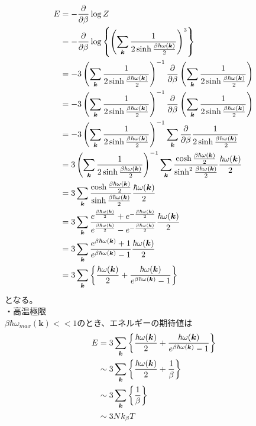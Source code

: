 \documentclass{jsarticle}  %
\numberwithin{equation}{section} %
\numberwithin{figure}{section}
\begin{document}
    \begin{align}
        E &= -\frac{\partial }{\partial \beta} \log Z \notag \\
        &= -\frac{\partial }{\partial \beta} \log \left\{ \left( \sum_{\bm{k}} \frac{1}{2 \sinh \frac{\beta \hbar \omega (\bm{k})}{2}}\right)^{3}  \right\} \notag \\
        &= -3 \left( \sum_{\bm{k}} \frac{1}{2 \sinh \frac{\beta \hbar \omega (\bm{k})}{2}}\right)^{-1} \frac{\partial }{\partial \beta}  \left( \sum_{\bm{k}} \frac{1}{2 \sinh \frac{\beta \hbar \omega (\bm{k})}{2}}\right)  \notag \\
        &= -3 \left( \sum_{\bm{k}} \frac{1}{2 \sinh \frac{\beta \hbar \omega (\bm{k})}{2}}\right)^{-1} \frac{\partial }{\partial \beta}  \left( \sum_{\bm{k}} \frac{1}{2 \sinh \frac{\beta \hbar \omega (\bm{k})}{2}}\right)  \notag \\
        &= -3 \left( \sum_{\bm{k}} \frac{1}{2 \sinh \frac{\beta \hbar \omega (\bm{k})}{2}}\right)^{-1} \sum_{\bm{k}} \frac{\partial }{\partial \beta} \frac{1}{2 \sinh \frac{\beta \hbar \omega (\bm{k})}{2}}  \notag \\
        &= 3 \left( \sum_{\bm{k}} \frac{1}{2 \sinh \frac{\beta \hbar \omega (\bm{k})}{2}}\right)^{-1} \sum_{\bm{k}} \frac{\cosh \frac{\beta \hbar \omega (\bm{k})}{2}}{ \sinh^2 \frac{\beta \hbar \omega (\bm{k})}{2}} \frac{\hbar \omega (\bm{k})}{2}  \notag \\
        &= 3 \sum_{\bm{k}} \frac{\cosh \frac{\beta \hbar \omega (\bm{k})}{2}}{ \sinh \frac{\beta \hbar \omega (\bm{k})}{2}} \frac{\hbar \omega (\bm{k})}{2}  \notag \\
        &= 3 \sum_{\bm{k}} \frac{e^{\frac{\beta \hbar \omega (\bm{k})}{2}} + e^{-\frac{\beta \hbar \omega (\bm{k})}{2}}}{ e^{\frac{\beta \hbar \omega (\bm{k})}{2}} - e^{-\frac{\beta \hbar \omega (\bm{k})}{2}}} \frac{\hbar \omega (\bm{k})}{2}  \notag \\
        &= 3 \sum_{\bm{k}} \frac{e^{\beta \hbar \omega (\bm{k})} + 1}{ e^{\beta \hbar \omega (\bm{k})} - 1} \frac{\hbar \omega (\bm{k})}{2}  \notag \\
        &=3 \sum_{\bm{k}} \left\{ \frac{\hbar \omega (\bm{k})}{2}  +\frac{\hbar \omega (\bm{k})}{ e^{\beta \hbar \omega (\bm{k})} - 1} \right\}
    \end{align}
    となる。\\
    ・高温極限\\
    $\beta \hbar \omega_{max}(\bm{k}) << 1$のとき、エネルギーの期待値は
    \begin{align}
        E &= 3 \sum_{\bm{k}} \left\{ \frac{\hbar \omega (\bm{k})}{2}  +\frac{\hbar \omega (\bm{k})}{ e^{\beta \hbar \omega (\bm{k})} - 1} \right\} \notag \\
        &\sim  3 \sum_{\bm{k}}  \left\{ \frac{\hbar \omega (\bm{k})}{2}  +\frac{1}{\beta} \right\} \notag \\
        &\sim  3 \sum_{\bm{k}}  \left\{ \frac{1}{\beta} \right\} \notag \\
        &\sim 3Nk_\beta T
    \end{align}
\end{document}
